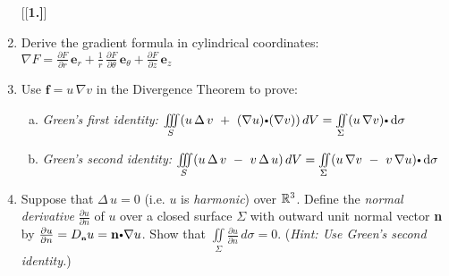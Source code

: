 \begin{enumerate}[\bfseries 1.]
[{[\bfseries 1.]}]
 \item Derive the gradient formula in cylindrical coordinates: $\nabla F =
  \frac{\partial F}{\partial r}\,\textbf{e}_{r} +
  \frac{1}{r}\,\frac{\partial F}{\partial \theta}\,\textbf{e}_{\theta}+\frac{\partial F}{\partial z}\,\textbf{e}_{z}$
 \item Use $\textbf{f} = u\,\nabla v$ in the Divergence Theorem to prove:
  \begin{enumerate}[(a)]
   \item \emph{Green's first identity:}
    $\iiint\limits_{S} (u\,\Delta\,v ~+~ \Dotprod{(\nabla u)}{(\nabla v)})\,dV =
    \iint\limits_{\Sigma} \Dotprod{(u\,\nabla v)}{\d\sigma}$
   \item \emph{Green's second identity:}
    $\iiint\limits_{S} (u\,\Delta\,v ~-~ v\,\Delta\,u)\,dV =
    \iint\limits_{\Sigma} \Dotprod{(u\,\nabla v ~-~ v\,\nabla u)}{\d\sigma}$
  \end{enumerate}
 \item Suppose that $\Delta\,u = 0$ (i.e. $u$ is \emph{harmonic}) over $\mathbb{R}^{3}$. Define the
  \emph{normal derivative} $\frac{\partial u}{\partial n}$ of $u$ over a closed surface
  $\Sigma$ with outward unit normal vector \textbf{n} by $\frac{\partial u}{\partial n} = \ssub{D}{\textbf{n}}u =
  \Dotprod{\textbf{n}}{\nabla u}$. Show that $\iint\limits_{\Sigma} \frac{\partial u}{\partial n} \,d\sigma = 0$.
  (\emph{Hint: Use Green's second identity.})
\end{enumerate}

